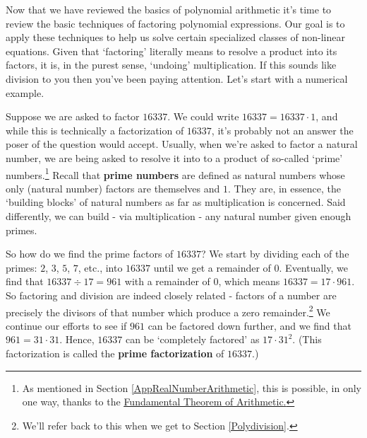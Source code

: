 \documentclass{ximera}
\begin{document}
	\author{Stitz-Zeager}




\setcounter{footnote}{0}

\label{AppFactoring}

Now that we have reviewed the basics of polynomial arithmetic it's time to review the basic techniques of factoring polynomial expressions.  Our goal is to apply these techniques to help us solve certain specialized classes of non-linear equations.  Given that `factoring' literally means to resolve a product into its factors, it is, in the purest sense, `undoing' multiplication.  If this sounds like division to you then you've been paying attention.  Let's start with a numerical example.  

 

Suppose we are asked to factor $16337$.  We could write $16337 = 16337 \cdot 1$, and while this is technically a factorization of $16337$,  it's probably not an answer the poser of the question would accept.  Usually, when we're asked to factor a natural number, we are being asked to resolve it into to a product of so-called 	`prime' numbers.\footnote{As mentioned in Section \ref{AppRealNumberArithmetic}, this is possible, in only one way, thanks to the \href{https://en.wikipedia.org/wiki/Fundamental_theorem_of_arithmetic}{\underline{Fundamental Theorem of Arithmetic}.}}  Recall that \textbf{prime numbers} are defined as natural numbers whose only (natural number) factors are themselves and $1$. They are, in essence, the `building blocks' of natural numbers as far as multiplication is concerned.  Said differently, we can build - via multiplication - any natural number given enough primes.  

 

So how do we find the prime factors of $16337$?  We start by dividing each of the primes: $2$, $3$, $5$, $7$, etc., into $16337$ until we get a remainder of $0$.  Eventually, we find that $16337 \div 17 = 961$ with a remainder of $0$, which means $16337 = 17 \cdot 961$.  So factoring and division are indeed closely related - factors of a number are precisely the divisors of that number which produce a zero remainder.\footnote{We'll refer back to this when we get to Section \ref{Polydivision}.}  We continue our efforts to see if $961$ can be factored down further, and we find that $961 = 31 \cdot 31$.  Hence, $16337$ can be `completely factored' as $17 \cdot 31^2$.  (This factorization is called the \textbf{prime factorization} of $16337$.)  
\end{document}
